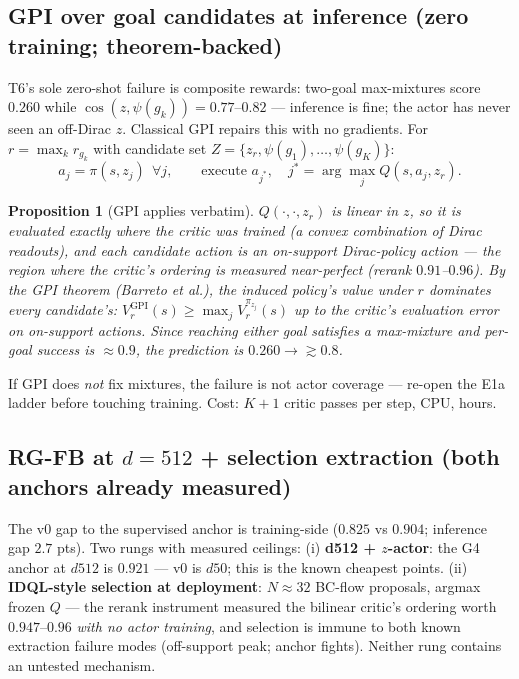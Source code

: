 \documentclass[11pt]{article}
\newtheorem{proposition}{Proposition}
\theoremstyle{definition}
\theoremstyle{remark}
\begin{document}
\subsection{GPI over goal candidates at inference (zero training; theorem-backed)}
\label{sec:gpi}

T6's sole zero-shot failure is composite rewards: two-goal max-mixtures score $0.260$ while
$\cos(z,\psi(g_k))=0.77$--$0.82$ --- inference is fine; the actor has never seen an
off-Dirac $z$. Classical GPI repairs this with no gradients. For $r=\max_k r_{g_k}$ with
candidate set $Z=\{z_r,\psi(g_1),\dots,\psi(g_K)\}$:
\begin{equation}
a_j=\pi(s,z_j)\ \ \forall j,\qquad \text{execute } a_{j^*},\quad
j^*=\arg\max_j Q(s,a_j,z_r).
\label{eq:gpi}
\end{equation}

\begin{proposition}[GPI applies verbatim]\label{prop:gpi}
$Q(\cdot,\cdot,z_r)$ is linear in $z$, so it is evaluated exactly where the critic was
trained (a convex combination of Dirac readouts), and each candidate action is an on-support
Dirac-policy action --- the region where the critic's ordering is measured near-perfect
(rerank $0.91$--$0.96$). By the GPI theorem (Barreto et al.), the induced policy's value
under $r$ dominates every candidate's: $V^{\mathrm{GPI}}_r(s)\ge\max_j V^{\pi_{z_j}}_r(s)$
up to the critic's evaluation error on on-support actions. Since reaching \emph{either} goal
satisfies a max-mixture and per-goal success is $\approx0.9$, the prediction is
$0.260\to\gtrsim0.8$.
\end{proposition}

If GPI does \emph{not} fix mixtures, the failure is not actor coverage --- re-open the E1a
ladder before touching training. Cost: $K{+}1$ critic passes per step, CPU, hours.

\subsection{RG-FB at $d{=}512$ + selection extraction (both anchors already measured)}
\label{sec:ladder}

The v0 gap to the supervised anchor is training-side ($0.825$ vs $0.904$; inference gap
$2.7$ pts). Two rungs with measured ceilings: (i) \textbf{d512 + $z$-actor}: the G4 anchor at
$d512$ is $0.921$ --- v0 is $d50$; this is the known cheapest points. (ii) \textbf{IDQL-style
selection at deployment}: $N{\approx}32$ BC-flow proposals, argmax frozen $Q$ --- the rerank
instrument measured the bilinear critic's ordering worth $0.947$--$0.96$ \emph{with no actor
training}, and selection is immune to both known extraction failure modes (off-support peak;
anchor fights). Neither rung contains an untested mechanism.
\end{document}
